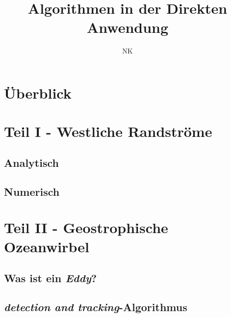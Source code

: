 \documentclass{beamer}
\begin{document}
\title{Algorithmen in der Direkten Anwendung}
\author{NK}
%
\section*{Überblick}



\section{Teil I - Westliche Randströme}



\subsection{Analytisch}


\subsection{Numerisch}



\section{Teil II - Geostrophische Ozeanwirbel}
\subsection{Was ist ein \protect\textit{Eddy}?}


\subsection{\protect\textit{detection and tracking}-Algorithmus}





%
%
%
%
\end{document}
